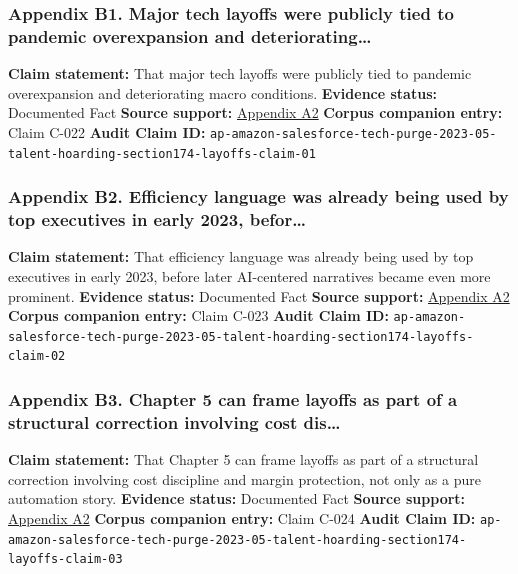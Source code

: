 \documentclass[
  american,
  11pt,
  letterpaper,
]{article}
\begin{document}
\subsubsection{Appendix B1. Major tech layoffs were publicly tied to
pandemic overexpansion and
deteriorating\ldots{}}\label{ch-05-appendix-b1-major-tech-layoffs-were-publicly-tied-to-pandemic-overexpansion-and-deteriorating}

\textbf{Claim statement:} That major tech layoffs were publicly tied to
pandemic overexpansion and deteriorating macro conditions.
\textbf{Evidence status:} Documented Fact \textbf{Source support:}
\hyperref[ch-05-appendix-a2-amazon-salesforce-jettison-jobs-in-latest-tech-worker-purge]{Appendix
A2} \textbf{Corpus companion entry:} Claim C-022 \textbf{Audit Claim
ID:}
\texttt{ap-amazon-salesforce-tech-purge-2023-05-talent-hoarding-section174-layoffs-claim-01}

\subsubsection{Appendix B2. Efficiency language was already being used
by top executives in early 2023,
befor\ldots{}}\label{ch-05-appendix-b2-efficiency-language-was-already-being-used-by-top-executives-in-early-2023-befor}

\textbf{Claim statement:} That efficiency language was already being
used by top executives in early 2023, before later AI-centered
narratives became even more prominent. \textbf{Evidence status:}
Documented Fact \textbf{Source support:}
\hyperref[ch-05-appendix-a2-amazon-salesforce-jettison-jobs-in-latest-tech-worker-purge]{Appendix
A2} \textbf{Corpus companion entry:} Claim C-023 \textbf{Audit Claim
ID:}
\texttt{ap-amazon-salesforce-tech-purge-2023-05-talent-hoarding-section174-layoffs-claim-02}

\subsubsection{Appendix B3. Chapter 5 can frame layoffs as part of a
structural correction involving cost
dis\ldots{}}\label{ch-05-appendix-b3-chapter-5-can-frame-layoffs-as-part-of-a-structural-correction-involving-cost-dis}

\textbf{Claim statement:} That Chapter 5 can frame layoffs as part of a
structural correction involving cost discipline and margin protection,
not only as a pure automation story. \textbf{Evidence status:}
Documented Fact \textbf{Source support:}
\hyperref[ch-05-appendix-a2-amazon-salesforce-jettison-jobs-in-latest-tech-worker-purge]{Appendix
A2} \textbf{Corpus companion entry:} Claim C-024 \textbf{Audit Claim
ID:}
\texttt{ap-amazon-salesforce-tech-purge-2023-05-talent-hoarding-section174-layoffs-claim-03}
\end{document}
